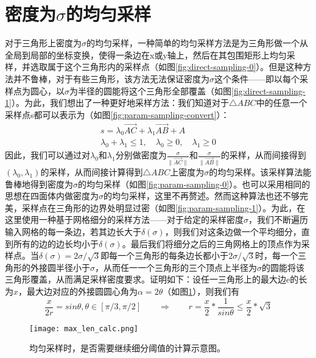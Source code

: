 \section{密度为$\sigma$的均匀采样}
对于三角形上密度为$\sigma$的均匀采样，一种简单的均匀采样方法是为三角形做一个从全局到局部的坐标变换，使得一条边在x或y轴上，然后在其包围矩形上均匀采样，并选取属于这个三角形内的采样点（如图\ref{fig:direct-sampling-0}）。但是这种方法并不鲁棒，对于有些三角形，该方法无法保证密度为$\sigma$这个条件——即以每个采样点为圆心，以$\sigma$为半径的圆能将这个三角形全部覆盖（如图\ref{fig:direct-sampling-1}）。为此，我们想出了一种更好地采样方法：我们知道对于$\triangle ABC$中的任意一个采样点s都可以表示为（如图\ref{fig:param-sampling-convert}）：
\begin{equation}
  \begin{split}
    s = \lambda_0 \overrightarrow{AC}+\lambda_1 \overrightarrow{AB} + A\\
    \lambda_0 + \lambda_1 \leq 1, \quad \lambda_0 \geq 0, \quad \lambda_1 \geq 0
  \end{split}
\end{equation}
因此，我们可以通过对$\lambda_0$和$\lambda_1$分别做密度为$\frac{\sigma}{\parallel \overrightarrow{AC} \parallel}$和$\frac{\sigma}{\parallel \overrightarrow{AB} \parallel}$的采样，从而间接得到$(\lambda_0,\lambda_1)$的采样，从而间接计算得到$\triangle ABC$上密度为$\sigma$的均匀采样。该采样算法能鲁棒地得到密度为$\sigma$的均匀采样（如图\ref{fig:param-sampling-0}）。也可以采用相同的思想在四面体内做密度为$\sigma$的均匀采样，这里不再赘述。然而这种算法也还不够完美，采样点在三角形的边界处明显过密（如图\ref{fig:param-sampling-1}）。为此，在这里使用一种基于网格细分的采样方法——对于给定的采样密度$\sigma$，我们不断遍历输入网格的每一条边，若其边长大于$\delta(\sigma)$，则我们对这条边做一个平均细分，直到所有的边的边长均小于$\delta(\sigma)$。最后我们将细分之后的三角网格上的顶点作为采样点。当$\delta(\sigma)=2\sigma/\sqrt{3}$即每一个三角形的每条边长都小于$2\sigma/\sqrt{3}$时，每一个三角形的外接圆半径小于$\sigma$，从而任一一个三角形的三个顶点上半径为$\sigma$的圆能将该三角形覆盖，从而满足采样密度要求。证明如下：设任一三角形上的最大边e的长为$x$，最大边对应的外接圆圆心角为$\alpha = 2\theta$（如图\ref{fig:max-len-calc}），则我们有
\begin{equation}
  \frac{x}{2r} = sin\theta, \theta \in [\pi/3, \pi/2] \qquad
  \Rightarrow \qquad r =\frac{x}{2} * \frac{1}{sin \theta} \leq \frac{x}{2} * \sqrt{3}
\end{equation}

\begin{figure}[htbp]
  \centering
  \texttt{[image: max\_len\_calc.png]}
  \caption{均匀采样时，是否需要继续细分阈值的计算示意图。}
  \label{fig:max-len-calc}
\end{figure}


